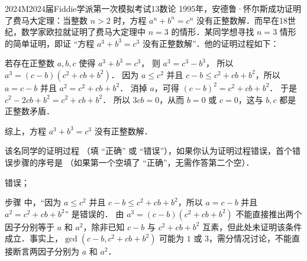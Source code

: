 
\begin{problem}{2024}{M}{2024届Fiddie学派第一次模拟考试}{13}{数论}
1995年，安德鲁·怀尔斯成功证明了费马大定理：当整数 $ n>2 $ 时，方程 $ a^n+b^n=c^n $ 没有正整数解．而早在18世纪，数学家欧拉就证明了费马大定理中 $ n=3 $ 的情形．某同学想寻找 $ n=3 $ 情形的简单证明，即证 “方程 $ a^3+b^3=c^3 $ 没有正整数解”．他的证明过程如下：

若存在正整数 $ a,b,c $ 使得 $ a^3+b^3=c^3 $，  
则 $ a^3=c^3-b^3 $， \hfill {}  
所以 $ a^3=(c-b)(c^2+cb+b^2) $． \hfill {}  
因为 $ a\leq c^2 $ 并且 $ c-b\leq c^2+cb+b^2 $，所以 $ a=c-b $ 并且 $ a^2=c^2+cb+b^2 $． \hfill {}  
消掉 $ a $，可得 $ (c-b)^2=c^2+cb+b^2 $． \hfill {}  
于是 $ c^2-2cb+b^2=c^2+cb+b^2 $． \hfill {}  
所以 $ 3cb=0 $，从而 $ b=0 $ 或 $ c=0 $，这与 $ b,c $ 都是正整数矛盾． \hfill {}  

综上，方程 $ a^3+b^3=c^3 $ 没有正整数解．

该名同学的证明过程 \underline{\hspace{4em}} （填 “正确” 或 “错误”），如果你认为证明过程错误，首个错误步骤的序号是 \underline{\hspace{4em}} （如果第一个空填了 “正确”，无需作答第二个空）．
\end{problem}

\begin{answer}
错误；
\end{answer}

\begin{solutions}
步骤  中，“因为 $ a\leq c^2 $ 并且 $ c-b\leq c^2+cb+b^2 $，所以 $ a=c-b $ 并且 $ a^2=c^2+cb+b^2 $” 是错误的．  
由 $ a^3=(c-b)(c^2+cb+b^2) $ 不能直接推出两个因子分别等于 $ a $ 和 $ a^2 $，除非已知 $ c-b $ 与 $ c^2+cb+b^2 $ 互素，但此处未证明该条件成立．事实上，$ \gcd(c-b, c^2+cb+b^2) $ 可能为 $ 1 $ 或 $ 3 $，需分情况讨论，不能直接断言两因子分别为 $ a $ 和 $ a^2 $．  

\end{solutions}